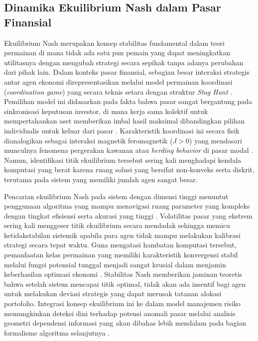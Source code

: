 \subsection{Dinamika Ekuilibrium Nash dalam Pasar Finansial}
Ekuilibrium Nash merupakan konsep stabilitas fundamental dalam teori permainan di mana tidak ada satu pun pemain yang dapat meningkatkan utilitasnya dengan mengubah strategi secara sepihak tanpa adanya perubahan dari pihak lain. Dalam konteks pasar finansial, sebagian besar interaksi strategis antar agen ekonomi direpresentasikan melalui model permainan koordinasi (\textit{coordination game}) yang secara teknis setara dengan struktur \textit{Stag Hunt} \cite{szabo_evolutionary_2016}. Pemilihan model ini didasarkan pada fakta bahwa pasar sangat bergantung pada sinkronisasi keputusan investor, di mana kerja sama kolektif untuk mempertahankan aset memberikan imbal hasil maksimal dibandingkan pilihan individualis untuk keluar dari pasar \cite{sarkar_quantum_2018}. Karakteristik koordinasi ini secara fisik dianalogikan sebagai interaksi magnetik feromagnetik ($J > 0$) yang mendasari munculnya fenomena pergerakan kawanan atau \textit{herding behavior} di pasar modal \cite{galam_ising_2010}. Namun, identifikasi titik ekuilibrium tersebut sering kali menghadapi kendala komputasi yang berat karena ruang solusi yang bersifat non-konveks serta diskrit, terutama pada sistem yang memiliki jumlah agen sangat besar.

Pencarian ekuilibrium Nash pada sistem dengan dimensi tinggi menuntut penggunaan algoritma yang mampu menavigasi ruang parameter yang kompleks dengan tingkat efisiensi serta akurasi yang tinggi \cite{wang_achieving_2025}. Volatilitas pasar yang ekstrem sering kali menggeser titik ekuilibrium secara mendadak sehingga memicu ketidakstabilan sistemik apabila para agen tidak mampu melakukan kalibrasi strategi secara tepat waktu. Guna mengatasi hambatan komputasi tersebut, pemanfaatan kelas permainan yang memiliki karakteristik konvergensi stabil melalui fungsi potensial tunggal menjadi sangat krusial dalam menjamin keberhasilan optimasi ekonomi \cite{monderer_potential_1996}. Stabilitas Nash memberikan jaminan teoretis bahwa setelah sistem mencapai titik optimal, tidak akan ada insentif bagi agen untuk melakukan deviasi strategis yang dapat merusak tatanan alokasi portofolio. Integrasi konsep ekuilibrium ini ke dalam model manajemen risiko memungkinkan deteksi dini terhadap potensi anomali pasar melalui analisis geometri dependensi informasi yang akan dibahas lebih mendalam pada bagian formalisme algoritma selanjutnya \cite{gong_quantum_2025}.

